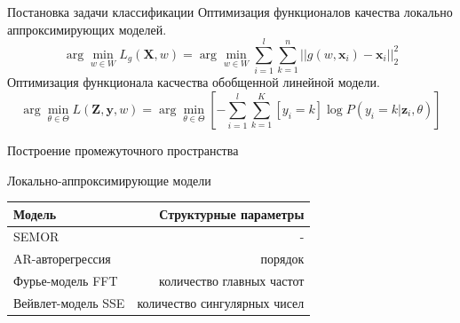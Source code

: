 \documentclass{beamer}
\newcommand{\bz}{\mathbf{z}}
\newcommand{\bx}{\mathbf{x}}
\newcommand{\by}{\mathbf{y}}
\newcommand{\bX}{\mathbf{X}}
\newcommand{\bZ}{\mathbf{Z}}
\newcommand{\sbrs}[1]{\left[#1\right]}
\begin{document}

\begin{frame}{Постановка задачи классификации}
    Оптимизация функционалов качества локально аппроксимирующих моделей.
    $$
    \arg\min_{w \in W} L_g(\bX, w) = \arg\min_{w \in W} \sum_{i=1}^l\sum_{k=1}^n ||g(w, \bx_i) - \bx_i||_2^2
    $$
    Оптимизация функционала касчества обобщенной линейной модели.
    $$
    \arg\min_{\theta \in \Theta} L(\bZ, \by, w) = \arg\min_{\theta \in \Theta} \sbrs{-\sum_{i=1}^l\sum_{k=1}^K [y_i = k]\log P(y_i = k| \bz_i, \theta)}
    $$
\end{frame}



\begin{frame}{Построение промежуточного пространства}
    \begin{block}{Локально-аппроксимирующие модели}
    \begin{center}
        \begin{tabular}{|l|r|}
            \hline
            Модель & Структурные параметры \\
            \hline
            SEMOR & - \\
            AR-авторегрессия & порядок \\
            Фурье-модель FFT & количество главных частот \\
            Вейвлет-модель SSE & количество сингулярных чисел\\
            \hline
            \end{tabular}
    \end{center}
    \end{block}
\end{frame}

\end{document}
